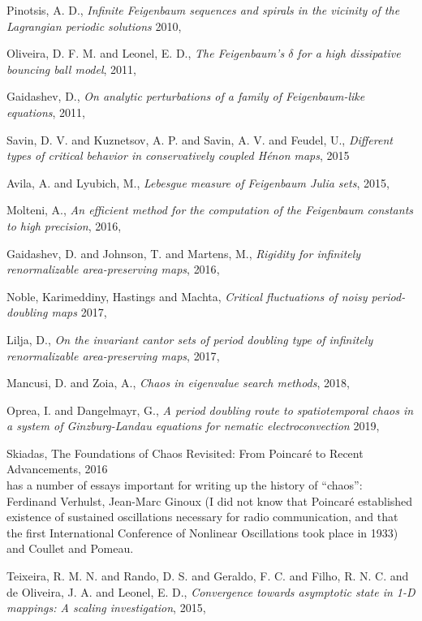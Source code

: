 \begin{description}
{Pinotsis, A. D.},
{\em Infinite {Feigenbaum} sequences and spirals in the vicinity of the
{Lagrangian} periodic solutions}
{2010},

{Oliveira, D. F. M. and Leonel, E. D.},
{\em The {Feigenbaum}'s {$\delta$} for a high dissipative bouncing ball model},
{2011},

{Gaidashev, D.},
{\em On analytic perturbations of a family of {Feigenbaum}-like equations},
 {2011},

{Savin, D. V. and Kuznetsov, A. P. and Savin, A. V. and Feudel, U.},
{\em Different types of critical behavior in conservatively coupled {H{\'{e}}non} maps},
{2015}

{Avila, A. and Lyubich, M.},
{\em Lebesgue measure of Feigenbaum Julia sets},
{2015},

{Molteni, A.},
{\em An efficient method for the computation of the {Feigenbaum} constants to high precision},
{2016},

{Gaidashev, D. and Johnson, T. and Martens, M.},
{\em Rigidity for infinitely renormalizable area-preserving maps},
{2016},

Noble, Karimeddiny, Hastings and Machta,
{\em Critical fluctuations of noisy period-doubling maps}
{2017},

{Lilja, D.},
{\em On the invariant cantor sets of period doubling type of infinitely
renormalizable area-preserving maps},
{2017},

{Mancusi, D. and Zoia, A.},
{\em Chaos in eigenvalue search methods},
{2018},

{Oprea, I. and Dangelmayr, G.},
{\em A period doubling route to spatiotemporal chaos in a system of
{Ginzburg-Landau} equations for nematic electroconvection}
{2019},

{Skiadas},
{{The Foundations of Chaos Revisited: From Poincar{\'{e}} to Recent Advancements}},
{2016}
\\
has a number of essays important for writing up the history of ``chaos'':
Ferdinand Verhulst, Jean-Marc Ginoux (I did not know that Poincar\'e
established existence of sustained oscillations necessary for radio
communication, and that the first International Conference of Nonlinear
Oscillations took place in 1933) and
Coullet and Pomeau.

{Teixeira, R. M. N. and Rando, D. S. and Geraldo, F. C. and Filho, R. N.
C. and de Oliveira, J. A. and Leonel, E. D.},
{\em Convergence towards asymptotic state in {1-D} mappings: {A} scaling
investigation},
{2015},


\end{description}
